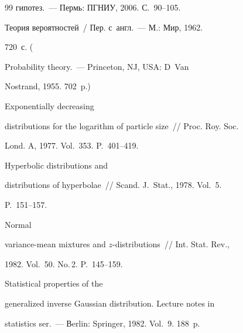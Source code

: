 {{\begin{thebibliography}{99}
гипотез.~--- Пермь: ПГНИУ, 2006. С.~90--105.







 Теория вероятностей~/ Пер. с~англ.~--- М.: Мир, 1962.


720~с. ( 


Probability theory.~--- Princeton, NJ, USA: D~Van


Nostrand, 1955. 702~p.)







 Exponentially decreasing


distributions for the logarithm of particle size~/\!\!/ Proc. Roy. Soc.


Lond. A, 1977. Vol.~353. P.~401--419.







 Hyperbolic distributions and


distributions of hyperbolae~/\!\!/ Scand. J.~Stat., 1978. Vol.~5.


P.~151--157.







 Normal


variance-mean mixtures and $z$-distributions~/\!\!/ Int. Stat. Rev.,


1982. Vol.~50. No.\,2. P.~145--159.







 Statistical properties of the


generalized inverse Gaussian distribution. Lecture notes in


statistics ser.~--- Вerlin: Springer, 1982.  Vol.~9. 188~p.








\end{thebibliography}}}
